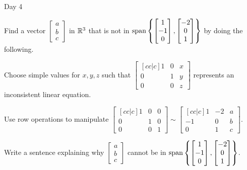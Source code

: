 \begin{applicationActivities}{Day 4}
\begin{activity}{15}
  Find a vector \(\begin{bmatrix}a\\b\\c\end{bmatrix}\)
  in \(\mathbb{R}^3\) that is not in
  \(\operatorname{span}\left\{\begin{bmatrix}1\\-1\\0\end{bmatrix},
  \begin{bmatrix}-2\\0\\1\end{bmatrix}\right\}\) by doing the following.
    \begin{subactivity}
      Choose simple values for \(x,y,z\) such that
      \(\begin{bmatrix}[cc|c]1&0&x\\0&1&y\\0&0&z\end{bmatrix}\)
      represents an inconsistent linear equation.
    \end{subactivity}
    \begin{subactivity}
      Use row operations to manipulate
      \(\begin{bmatrix}[cc|c]1&0&0\\0&1&0\\0&0&1\end{bmatrix}\sim
      \begin{bmatrix}[cc|c]1&-2&a\\-1&0&b\\0&1&c\end{bmatrix}\).
    \end{subactivity}
    \begin{subactivity}
      Write a sentence explaining why \(\begin{bmatrix}a\\b\\c\end{bmatrix}\)
      cannot be in \(\operatorname{span}\left\{\begin{bmatrix}1\\-1\\0\end{bmatrix},
      \begin{bmatrix}-2\\0\\1\end{bmatrix}\right\}\).
    \end{subactivity}
\end{activity}


\end{applicationActivities}

